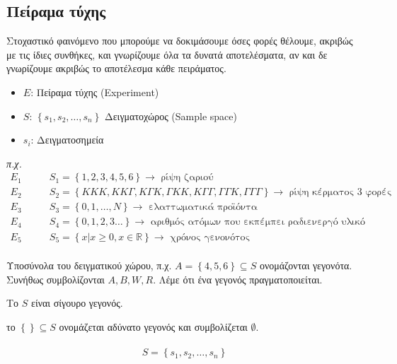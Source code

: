 \documentclass[11pt,a4paper,titlepage,draft]{article}
\begin{document}
\subsection{Πείραμα τύχης}
Στοχαστικό φαινόμενο που μπορούμε να δοκιμάσουμε όσες φορές θέλουμε, ακριβώς με τις ίδιες συνθήκες, και γνωρίζουμε όλα τα δυνατά αποτελέσματα, αν και δε γνωρίζουμε ακριβώς το αποτέλεσμα κάθε πειράματος.

\begin{itemize}
\item \(E\): Πείραμα τύχης (\textlatin{Experiment})
\item \(S\): \( \left\lbrace s_1,s_2, \dots , s_n \right\rbrace\) Δειγματοχώρος (\textlatin{Sample space})
\item \(s_i\): Δειγματοσημεία
\end{itemize}

\textit{π.χ.}
\begin{align*}
E_1 \qquad & S_1 = \left\lbrace 1,2,3,4,5,6 \right\rbrace \rightarrow \text{ ρίψη ζαριού}\\
E_2 \qquad & S_2 = \left\lbrace KKK, KK\Gamma , K\Gamma K, \Gamma K K, K \Gamma \Gamma, \Gamma \Gamma K, \Gamma \Gamma \Gamma \right\rbrace \rightarrow \text{ ρίψη κέρματος 3 φορές} \\
E_3 \qquad & S_3 = \left\lbrace 0,1,\dots,N \right\rbrace \rightarrow \text{ ελαττωματικά προϊόντα}\\
E_4 \qquad & S_4 = \left\lbrace 0,1,2,3\dots \right\rbrace \rightarrow \text{ αριθμός ατόμων που εκπέμπει ραδιενεργό υλικό}\\
E_5 \qquad & S_5 = \left\lbrace x | x \geq 0, x \in \mathbb R \right\rbrace \rightarrow \text{ χρόνος γενονότος}
\end{align*}

\paragraph{}
Υποσύνολα του δειγματικού χώρου, π.χ. \(A = \left\lbrace 4,5,6 \right\rbrace \subseteq S\) ονομάζονται γεγονότα. Συνήθως συμβολίζονται \(A,B,W,R\). Λέμε ότι ένα γεγονός πραγματοποιείται.

Το \(S\) είναι σίγουρο γεγονός.

το \(\left\lbrace \right\rbrace \subseteq S \) ονομάζεται αδύνατο γεγονός και συμβολίζεται \( \emptyset \).

\paragraph{}
\[S =  \left\lbrace s_1,s_2,\dots,s_n  \right\rbrace \]
\end{document}
